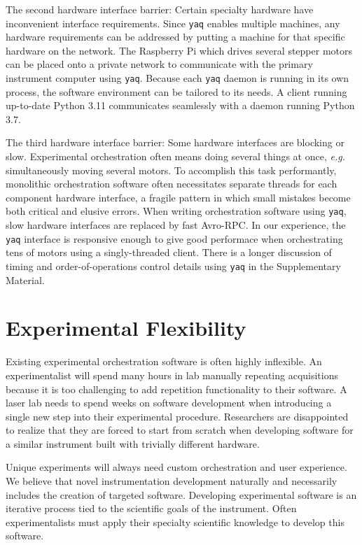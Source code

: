 \documentclass[aip, amsmath, amssymb, reprint,]{revtex4-2}
\newcommand\yaq{\texttt{yaq}}
\begin{document}
The second hardware interface barrier: Certain specialty hardware have inconvenient interface requirements.
Since \yaq{} enables multiple machines, any hardware requirements can be addressed by putting a machine for that specific hardware on the network.
The Raspberry Pi which drives several stepper motors can be placed onto a private network to communicate with the primary instrument computer using \yaq{}.
Because each \yaq{} daemon is running in its own process, the software environment can be tailored to its needs.
A client running up-to-date Python 3.11 communicates seamlessly with a daemon running Python 3.7.

The third hardware interface barrier: Some hardware interfaces are blocking or slow.
Experimental orchestration often means doing several things at once, \textit{e.g.} simultaneously moving several motors.
To accomplish this task performantly, monolithic orchestration software often necessitates separate threads for each component hardware interface, a fragile pattern in which small mistakes become both critical and elusive errors.
When writing orchestration software using \yaq{}, slow hardware interfaces are replaced by fast Avro-RPC.
In our experience, the \yaq{} interface is responsive enough to give good performace when orchestrating tens of motors using a singly-threaded client.
There is a longer discussion of timing and order-of-operations control details using \yaq{} in the Supplementary Material.

\section{Experimental Flexibility}

Existing experimental orchestration software is often highly inflexible.
An experimentalist will spend many hours in lab manually repeating acquisitions because it is too challenging to add repetition functionality to their software.
A laser lab needs to spend weeks on software development when introducing a single new step into their experimental procedure.
Researchers are disappointed to realize that they are forced to start from scratch when developing software for a similar instrument built with trivially different hardware.

Unique experiments will always need custom orchestration and user experience.
We believe that novel instrumentation development naturally and necessarily includes the creation of targeted software.
Developing experimental software is an iterative process tied to the scientific goals of the instrument.
Often experimentalists must apply their specialty scientific knowledge to develop this software.\cite{SegalJudith2005a} %
\end{document}
